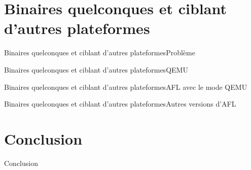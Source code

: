\documentclass{bredelebeamer}
\begin{document}
\section{Binaires quelconques et ciblant d'autres plateformes}

\begin{frame}{Binaires quelconques et ciblant d'autres plateformes}{Problème}
\end{frame}

\begin{frame}{Binaires quelconques et ciblant d'autres plateformes}{QEMU}
\end{frame}

\begin{frame}{Binaires quelconques et ciblant d'autres plateformes}{AFL avec le mode QEMU}
\end{frame}

\begin{frame}{Binaires quelconques et ciblant d'autres plateformes}{Autres versions d'AFL}
\end{frame}


\section*{Conclusion}

\begin{frame}{Conclusion}
\end{frame}
\end{document}
